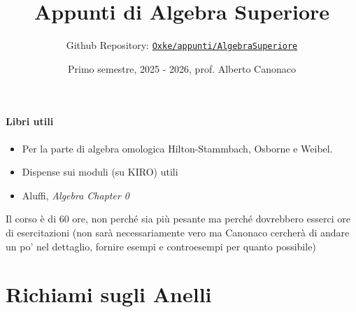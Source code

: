 

\title{Appunti di Algebra Superiore}
\author{Github Repository:
\href{https://github.com/Oxke/appunti/tree/main/AlgebraSuperiore}{\texttt{Oxke/appunti/AlgebraSuperiore}}}

\date{Primo semestre, 2025 \-- 2026, prof. Alberto Canonaco}



\maketitle

\paragraph{Libri utili}
\begin{itemize}[label = --]
    \item Per la parte di algebra omologica Hilton-Stammbach, Osborne e
Weibel.
    \item Dispense sui moduli (su KIRO) utili
    \item Aluffi, \emph{Algebra Chapter 0}
\end{itemize}
Il corso è di 60 ore, non perché sia più pesante ma perché dovrebbero esserci
ore di esercitazioni (non sarà necessariamente vero ma Canonaco cercherà di
andare un po' nel dettaglio, fornire esempi e controesempi per quanto possibile)

\section{Richiami sugli Anelli}



